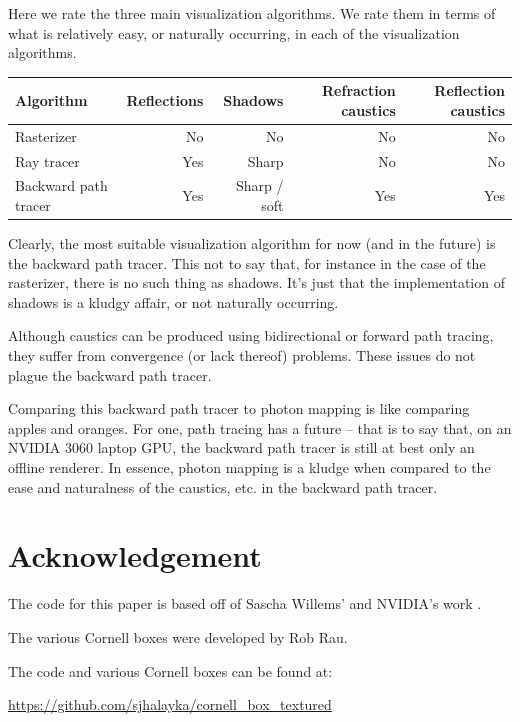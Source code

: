 \documentclass[10pt]{article}
\begin{document}
Here we rate the three main visualization algorithms.
We rate them in terms of what is relatively easy, or naturally occurring, in each of the visualization algorithms.
\begin{center}
\begin{tabular}{| l | r | r | r | r |}
  \hline
 Algorithm &  Reflections & Shadows & Refraction caustics & Reflection caustics \\
\hline
\hline
Rasterizer & No & No & No &  No \\
Ray tracer & Yes & Sharp & No & No  \\
Backward path tracer & Yes & Sharp / soft & Yes & Yes \\
  \hline  
\end{tabular}
\end{center}
Clearly, the most suitable visualization algorithm for now (and in the future) is the backward path tracer.
This not to say that, for instance in the case of the rasterizer, there is no such thing as shadows.
It's just that the implementation of shadows is a kludgy affair, or not naturally occurring.

Although caustics can be produced using bidirectional or forward path tracing, they suffer from convergence (or lack thereof) problems.
These issues do not plague the backward path tracer.

Comparing this backward path tracer to photon mapping \cite{john} is like comparing apples and oranges.
For one, path tracing has a future -- that is to say that, on an NVIDIA 3060 laptop GPU, the backward path tracer is still at best only an offline renderer.
In essence, photon mapping is a kludge when compared to the ease and naturalness of the caustics, etc. in the backward path tracer.




\section{Acknowledgement}

The code for this paper is based off of Sascha Willems' and NVIDIA's work \cite{willems1, willems2, nvidia}.

The various Cornell boxes were developed by Rob Rau.

The code and various Cornell boxes can be found at: 

\url{https://github.com/sjhalayka/cornell_box_textured}
\end{document}
